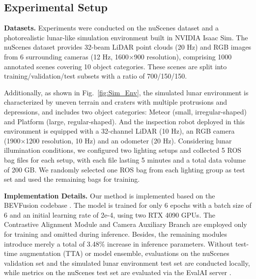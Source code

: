 \documentclass[letterpaper, 10 pt, conference]{ieeeconf}  %
\begin{document}
\subsection{Experimental Setup}
\textbf{Datasets.} Experiments were conducted on the nuScenes \cite{caesar2020nuscenes} dataset and a photorealistic lunar-like simulation environment built in NVIDIA Isaac Sim. 
The nuScenes dataset provides 32-beam LiDAR point clouds (20 Hz) and RGB images from 6 surrounding cameras (12 Hz, 1600$\times$900 resolution), comprising 1000 annotated scenes covering 10 object categories. These scenes are split into training/validation/test subsets with a ratio of 700/150/150.

Additionally, as shown in Fig.~\ref{fig:Sim_Env}, the simulated lunar environment is characterized by uneven terrain and craters with multiple protrusions and depressions, and includes two object categories: Meteor (small, irregular-shaped) and Platform (large, regular-shaped). And the inspection robot deployed in this environment is equipped with a 32-channel LiDAR (10 Hz), an RGB camera (1900$\times$1200 resolution, 10 Hz) and an odometer (20 Hz).
Considering lunar illumination conditions, we configured two lighting setups and collected 5 ROS bag files for each setup, with each file lasting 5 minutes and a total data volume of 200 GB.
We randomly selected one ROS bag from each lighting group as test set and used the remaining bags for training.

\textbf{Implementation Details.} Our method is implemented based on the BEVFusion codebase \cite{liu2023bevfusion}. 
The model is trained for only 6 epochs with a batch size of 6 and an initial learning rate of 2e-4, using two RTX 4090 GPUs.
The Contrastive Alignment Module and Camera Auxiliary Branch are employed only for training and omitted during inference. Besides, the remaining modules introduce merely a total of 3.48\% increase in inference parameters.
Without test-time augmentation (TTA) or model ensemble, evaluations on the nuScenes validation set and the simulated lunar environment test set are conducted locally, while metrics on the nuScenes test set are evaluated via the EvalAI server \cite{yadav2019evalai}.

\end{document}
